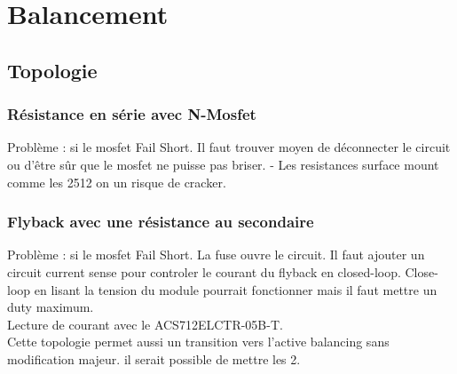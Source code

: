 

\section{Balancement}
	\subsection{Topologie}
		\subsubsection{R\'{e}sistance en s\'{e}rie avec N-Mosfet}
	Probl\`{e}me : si le mosfet Fail Short. Il faut trouver moyen de d\'{e}connecter le circuit ou d'\^{e}tre s\^{u}r que le mosfet ne puisse pas briser.
	- Les resistances surface mount comme les 2512 on un risque de cracker.
		\subsubsection{Flyback avec une r\'{e}sistance au secondaire}
	Probl\`{e}me : si le mosfet Fail Short. La fuse ouvre le circuit. Il faut ajouter un circuit current sense pour controler le courant du flyback en closed-loop. Close-loop en lisant la tension du module pourrait fonctionner mais il faut mettre un duty maximum. 
	\\Lecture de courant avec le ACS712ELCTR-05B-T.  \\
	Cette topologie permet aussi un transition vers l'active balancing sans modification majeur. il serait possible de mettre les 2.